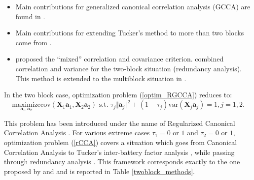 \documentclass[
]{jss}
\begin{document}
\begin{itemize}
\item
  Main contributions for generalized canonical correlation analysis
  (GCCA) are found in \cite{Horst1961, Carroll1968a, Kettenring1971, 
  Wold1982, Wold1985, Hanafi2007}.
\item
  Main contributions for extending Tucker's method to more than two
  blocks come from \cite{Carroll1968b, Chessel1996, Hanafi2006,
  Hanafi2010, Hanafi2011, Hanafi2006, Kramer2007, Smilde2003, TenBerge1988, 
  VandeGeer1984, Westerhuis1998, Wold1982, Wold1985}.
\item
  \cite{Carroll1968b} proposed the ``mixed'' correlation and covariance
  criterion. \cite{Wollenberg1977} combined correlation and variance for
  the two-block situation (redundancy analysis). This method is extended
  to the multiblock situation in \cite{Tenenhaus2011, Tenenhaus2017}.
\end{itemize}

In the two block case, optimization problem (\ref{optim_RGCCA}) reduces
to: \begin{equation}
\underset{ \mathbf a_1,  \mathbf a_2}{\text{maximize}} \text{
cov}\left(\mathbf X_1 \mathbf a_1, \mathbf X_2 \mathbf a_2 \right) \text{ s.t. } \tau_j
\Vert  \mathbf a_j \Vert^2 + (1-\tau_j)\text{var}(\mathbf X_j \mathbf a_j) = 1, j =1,2.
\label{rCCA} 
\end{equation}

This problem has been introduced under the name of Regularized Canonical
Correlation Analysis \citep{Vinod1976, Leurgans1993, Shawe2004}. For
various extreme cases \(\tau_1 = 0\) or \(1\) and \(\tau_2 = 0\) or
\(1\), optimization problem (\ref{rCCA}) covers a situation which goes
from Canonical Correlation Analysis \citep{Hotelling1933} to Tucker's
inter-battery factor analysis \citep{Tucker1958}, while passing through
redundancy analysis \citep{Wollenberg1977}. This framework corresponds
exactly to the one proposed by \cite{Borga1997} and \cite{Burnham1996}
and is reported in Table \ref{twoblock_methods}.
\end{document}
